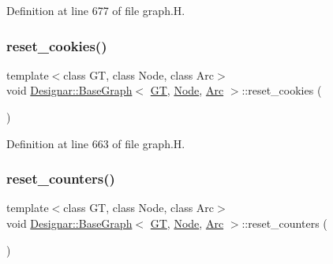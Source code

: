 Definition at line 677 of file graph.\+H.

\mbox{\label{class_designar_1_1_base_graph_a96a630fd589c34e7e6242f4349606e1c}} 
\subsubsection{\texorpdfstring{reset\+\_\+cookies()}{reset\_cookies()}}
{\footnotesize\ttfamily template$<$class GT, class Node, class Arc$>$ \\
void \hyperlink{class_designar_1_1_base_graph}{Designar\+::\+Base\+Graph}$<$ \hyperlink{demo-buildgraph_8_c_a3001c40d2c31ca87ed96cd7d1334a55e}{GT}, \hyperlink{namespace_designar_a5af326c65aa2bd26b26c410f2030d09e}{Node}, \hyperlink{namespace_designar_a3f55fb5513d62ff47cbc8f72b8e95d6f}{Arc} $>$\+::reset\+\_\+cookies (\begin{DoxyParamCaption}{ }\end{DoxyParamCaption})\hspace{0.3cm}{\ttfamily [inline]}}



Definition at line 663 of file graph.\+H.

\mbox{\label{class_designar_1_1_base_graph_a881c342d8f25d43f995ccfdf876622e1}} 
\subsubsection{\texorpdfstring{reset\+\_\+counters()}{reset\_counters()}}
{\footnotesize\ttfamily template$<$class GT, class Node, class Arc$>$ \\
void \hyperlink{class_designar_1_1_base_graph}{Designar\+::\+Base\+Graph}$<$ \hyperlink{demo-buildgraph_8_c_a3001c40d2c31ca87ed96cd7d1334a55e}{GT}, \hyperlink{namespace_designar_a5af326c65aa2bd26b26c410f2030d09e}{Node}, \hyperlink{namespace_designar_a3f55fb5513d62ff47cbc8f72b8e95d6f}{Arc} $>$\+::reset\+\_\+counters (\begin{DoxyParamCaption}{ }\end{DoxyParamCaption})\hspace{0.3cm}{\ttfamily [inline]}}



